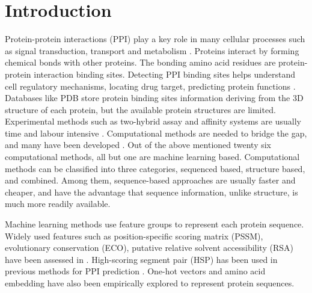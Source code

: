 \documentclass{bioinfo}
\begin{document}
\section{Introduction}
Protein-protein interactions (PPI) play a key role in many cellular processes such as signal transduction, transport and metabolism \citep{zhang2018review}. Proteins interact by forming chemical bonds with other proteins. The bonding amino acid residues are protein-protein interaction binding sites. Detecting PPI binding sites helps understand cell regulatory mechanisms, locating drug target, predicting protein functions \citep{bonetta2010interactome}. Databases like PDB \citep{berman2002protein} store protein binding sites information deriving from the 3D structure of each protein, but the available protein structures are limited. Experimental methods such as two-hybrid assay and affinity systems are usually time and labour intensive \citep{shoemaker2007deciphering}. Computational methods are needed to bridge the gap, and many have been developed \citep{cao2006enhanced, ofran2007isis, du2009improved, chen2009sequence, london2010structural, chen2010sequence, murakami2010applying, xue2011homppi, amos2011binding, jones2012psicov, asadabadi2013predictions, singh2014springs, wang2014fast, geng2015prediction, laine2015local, hwang2016hybrid, maheshwari2015prediction, liu2016prediction, wei2016protein, maheshwari2016template, jia2016ippbs, zhang2019sequence, wang2019protein, zhang2019scriber, zeng2019protein, xie2020prediction}. Out of the above mentioned twenty six computational methods, all but one are machine learning based. Computational methods can be classified into three categories, sequenced based, structure based, and combined. Among them, sequence-based approaches are usually faster  and cheaper, and have the advantage that sequence information, unlike structure, is much more readily available.

Machine learning methods use feature groups to represent each protein sequence. Widely used features such as position-specific scoring matrix (PSSM), evolutionary conservation (ECO), putative relative solvent accessibility (RSA) have been assessed in \citep{zhang2019comprehensive}. High-scoring segment pair (HSP) has been used in previous methods for PPI prediction \citep{li2017sprint}. One-hot vectors \citep{zhang2019sequence, zeng2019protein} and amino acid embedding \citep{asgari2015continuous, heinzinger2019modeling, asgari2019probabilistic} have also been empirically explored to represent protein sequences.
\end{document}
